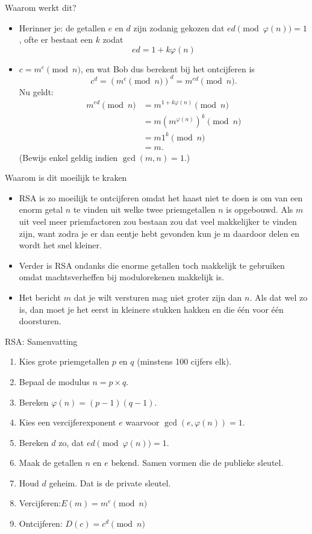\documentclass{beamer}
\begin{document}
\begin{frame}{Waarom werkt dit? }
\begin{itemize}
	\item 	Herinner je: de getallen $e$ en $d$ zijn zodanig gekozen dat $ e d \pmod{\varphi(n)} = 1$, ofte er bestaat een $k$ zodat
	\[
	ed = 1 + k \varphi(n)
	\]
	\item  $c = m^e\pmod{n}$, en wat Bob dus berekent bij het ontcijferen is
	\[
	c^d = (m^e \pmod{n})^d = m^{ed} \pmod{n}.
	\]	
	Nu geldt:
	\begin{align*}
	 m^{ed} \pmod{n} & = m^{1 + k\varphi(n)} \pmod{n} \\
	                 & = m ( m^{\varphi(n)})^k \pmod{n} \\
	                 & = m 1^k \pmod{n} \\
	                 & = m.
	\end{align*}
	(\tiny{Bewijs enkel geldig indien $\gcd(m, n) = 1$.})
\end{itemize}
\end{frame}

\begin{frame}{Waarom is dit moeilijk te kraken}
	\begin{itemize}
		\item RSA is zo moeilijk te ontcijferen omdat het haast niet te doen is om van een enorm getal $n$ te vinden uit welke twee priemgetallen $n$ is opgebouwd. Als $m$ uit veel meer priemfactoren zou bestaan zou dat veel makkelijker te vinden zijn, want zodra je er dan eentje hebt gevonden kun je m daardoor delen en wordt het snel kleiner.
		\item Verder is RSA ondanks die enorme getallen toch  makkelijk te gebruiken omdat machtsverheffen bij modulorekenen makkelijk is.
		\item 	Het bericht $m$ dat je wilt versturen mag niet groter zijn dan $n$. Als dat wel zo is, dan moet je het eerst in kleinere stukken hakken en die \'e\'en voor \'e\'en doorsturen.
	\end{itemize}


\end{frame}


\begin{frame}{RSA: Samenvatting}
	\begin{enumerate}
		\item Kies grote priemgetallen $p$ en $q$ (minstens 100 cijfers elk).
		\item Bepaal de modulus $n = p \times q$.
		\item Bereken $\varphi(n) = (p-1)(q-1)$.
		\item Kies een vercijferexponent $e$ waarvoor $\gcd(e,\varphi(n)) = 1$.
		\item Bereken $d$ zo, dat $e d  \pmod{\varphi(n)} = 1$.
		\item Maak de getallen $n$ en $e$ bekend. Samen vormen die de publieke sleutel.
		\item Houd $d$ geheim. Dat is de private sleutel.
		\item Vercijferen:$ E(m) = m^e \pmod{n}$
		\item Ontcijferen: $D(c) = c^d \pmod{n}$
	\end{enumerate}
\end{frame}
\end{document}
